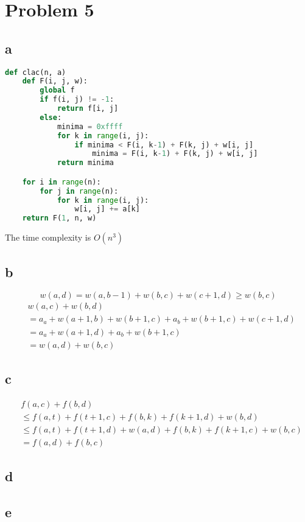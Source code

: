 \documentclass{article}
\begin{document}
\section*{Problem 5}
\subsection*{a}
\begin{lstlisting}[language = python]
def clac(n, a)
	def F(i, j, w):
		global f
		if f(i, j) != -1:
			return f[i, j]
		else:
			minima = 0xffff
			for k in range(i, j):
				if minima < F(i, k-1) + F(k, j) + w[i, j]
					minima = F(i, k-1) + F(k, j) + w[i, j]
			return minima

	for i in range(n):
		for j in range(n):
			for k in range(i, j):
				w[i, j] += a[k]
	return F(1, n, w)
\end{lstlisting}
The time complexity is $O(n^3)$
\subsection*{b}
$$w(a, d) = w(a, b-1) + w(b, c) + w(c+1, d) \geq w(b,c)$$
\begin{equation}\begin{aligned}
	&   w(a, c) + w(b, d) \\
	& = a_a + w(a+1, b) + w(b+1, c) + a_b + w(b+1, c) + w(c+1, d) \\
	& = a_a + w(a+1, d) + a_b + w(b+1, c) \\
	& = w(a, d) + w(b, c) 
\end{aligned}\end{equation}
\subsection*{c}
\begin{equation}\begin{aligned}
	&   f(a, c) + f(b, d) \\
	& \leq f(a, t) + f(t+1, c) + f(b, k) + f(k+1, d) + w(b, d) \\
	& \leq f(a, t) + f(t+1, d) + w(a, d) + f(b, k) + f(k+1, c) + w(b, c) \\
	& = f(a, d) + f(b, c) 
\end{aligned}\end{equation}
\subsection*{d}
\subsection*{e}
\end{document}

